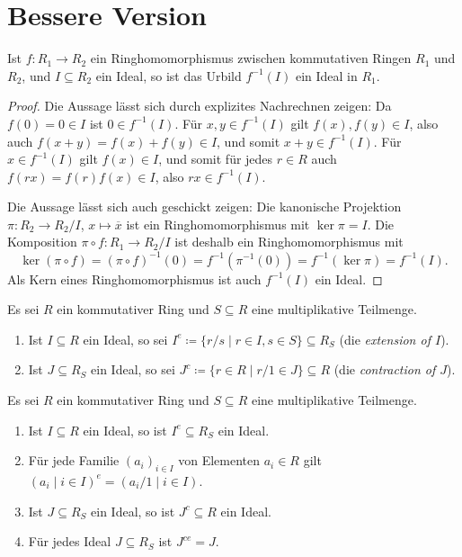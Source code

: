 \documentclass[a4paper,10pt]{scrartcl}
\begin{document}
\section{Bessere Version}


\begin{lemma}
  \label{lem: preimage of ideals}
  Ist $f \colon R_1 \to R_2$ ein Ringhomomorphismus zwischen kommutativen Ringen $R_1$ und $R_2$, und $I \subseteq R_2$ ein Ideal, so ist das Urbild $f^{-1}(I)$ ein Ideal in $R_1$.
\end{lemma}


\begin{proof}
  Die Aussage lässt sich durch explizites Nachrechnen zeigen:
  Da $f(0) = 0 \in I$ ist $0 \in f^{-1}(I)$.
  Für $x, y \in f^{-1}(I)$ gilt $f(x), f(y) \in I$, also auch $f(x + y) = f(x) + f(y) \in I$, und somit $x + y \in f^{-1}(I)$.
  Für $x \in f^{-1}(I)$ gilt $f(x) \in I$, und somit für jedes $r \in R$ auch $f(rx) = f(r) f(x) \in I$, also $r x \in f^{-1}(I)$.
  
  Die Aussage lässt sich auch geschickt zeigen:
  Die kanonische Projektion $\pi \colon R_2 \to R_2/I$, $x \mapsto \overline{x}$ ist ein Ringhomomorphismus mit $\ker \pi = I$.
  Die Komposition $\pi \circ f \colon R_1 \to R_2/I$ ist deshalb ein Ringhomomorphismus mit
  \[
      \ker(\pi \circ f)
    = (\pi \circ f)^{-1}(0)
    = f^{-1}(\pi^{-1}(0))
    = f^{-1}(\ker \pi)
    = f^{-1}(I).
  \]
  Als Kern eines Ringhomomorphismus ist auch $f^{-1}(I)$ ein Ideal.
\end{proof}


\begin{definition}
  Es sei $R$ ein kommutativer Ring und $S \subseteq R$ eine multiplikative Teilmenge.
  \begin{enumerate}
    \item
      Ist $I \subseteq R$ ein Ideal, so sei $I^e \coloneqq \{r/s \mid r \in I, s \in S\} \subseteq R_S$ (die \emph{extension of $I$}).
    \item
      Ist $J \subseteq R_S$ ein Ideal, so sei $J^c \coloneqq \{r \in R \mid r/1 \in J\} \subseteq R$
      (die \emph{contraction of $J$}).
  \end{enumerate}
\end{definition}


\begin{proposition}
  \label{prop: extension and contraction for localizations}
  Es sei $R$ ein kommutativer Ring und $S \subseteq R$ eine multiplikative Teilmenge.
  \begin{enumerate}
    \item
      Ist $I \subseteq R$ ein Ideal, so ist $I^e \subseteq R_S$ ein Ideal.
    \item
      Für jede Familie $(a_i)_{i \in I}$ von Elementen $a_i \in R$ gilt $(a_i \mid i \in I)^e = (a_i/1 \mid i \in I)$.
    \item
      Ist $J \subseteq R_S$ ein Ideal, so ist $J^c \subseteq R$ ein Ideal.
    \item
      Für jedes Ideal $J \subseteq R_S$ ist $J^{ce} = J$.
  \end{enumerate}
\end{proposition}
\end{document}

